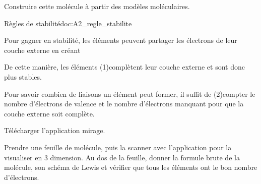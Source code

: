 \mesure
Construire cette molécule à partir des modèles moléculaires.

\begin{doc}{Règles de stabilité}{doc:A2_regle_stabilite}
  \begin{importants}
    Pour gagner en stabilité, les éléments peuvent partager les électrons de leur couche externe en créant 
    
    De cette manière, les éléments \texteTrou(1){complètent leur couche externe et sont donc plus stables.}
    
    Pour savoir combien de liaisons un élément peut former, il suffit de
    \texteTrou(2){compter le nombre d'électrons de valence et le nombre d'électrons manquant pour que la couche externe soit complète.}
  \end{importants}
\end{doc}


\telechargement Télécharger l'application mirage.

\mesure Prendre une feuille de molécule, puis la scanner avec l'application pour la visualiser en 3 dimension.
Au dos de la feuille, donner la formule brute de la molécule, son schéma de Lewis et vérifier que tous les éléments ont le bon nombre d'électrons.
